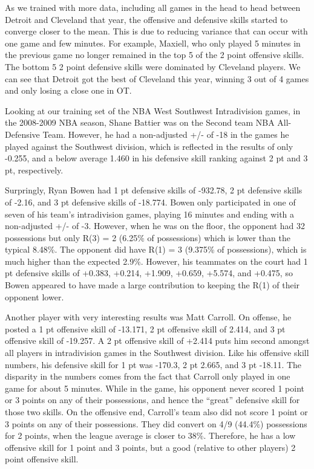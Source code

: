 \documentclass[10pt,twocolumn]{article}
\begin{document}
As we trained with more data, including all games in the head to head between Detroit and Cleveland that year, the offensive and defensive skills started to converge closer to the mean. This is due to reducing variance that can occur with one game and few minutes. For example, Maxiell, who only played 5 minutes in the previous game no longer remained in the top 5 of the 2 point offensive skills. The bottom 5 2 point defensive skills were dominated by Cleveland players. We can see that Detroit got the best of Cleveland this year, winning 3 out of 4 games and only losing a close one in OT.


Looking at our training set of the NBA West Southwest Intradivision games, in the 2008-2009 NBA season, Shane Battier was on the Second team NBA All-Defensive Team. However, he had a non-adjusted +/- of -18 in the games he played against the Southwest division, which is reflected in the results of only -0.255, and a below average 1.460 in his defensive skill ranking against 2 pt and 3 pt, respectively. 

Surpringly, Ryan Bowen had 1 pt defensive skills of -932.78, 2 pt defensive skills of -2.16, and 3 pt defensive skills of -18.774. Bowen only participated in one of seven of his team's intradivision games, playing 16 minutes and ending with a non-adjusted +/- of -3. However, when he was on the floor, the opponent had 32 possessions but only R(3) = 2 (6.25\% of possessions) which is lower than the typical 8.48\%. The opponent did have R(1) = 3 (9.375\% of possessions), which is much higher than the expected 2.9\%. However, his teammates on the court had 1 pt defensive skills of +0.383, +0.214, +1.909, +0.659, +5.574, and +0.475, so Bowen appeared to have made a large contribution to keeping the R(1) of their opponent lower. 

Another player with very interesting results was Matt Carroll. On offense, he posted a 1 pt offensive skill of -13.171, 2 pt offensive skill of 2.414, and 3 pt offensive skill of -19.257. A 2 pt offensive skill of +2.414 puts him second amongst all players in intradivision games in the Southwest division. Like his offensive skill numbers, his defensive skill for 1 pt was -170.3, 2 pt 2.665, and 3 pt -18.11. The disparity in the numbers comes from the fact that Carroll only played in one game for about 5 minutes. While in the game, his opponent never scored 1 point or 3 points on any of their possessions, and hence the ``great'' defensive skill for those two skills. On the offensive end, Carroll's team also did not score 1 point or 3 points on any of their possessions. They did convert on 4/9 (44.4\%) possessions for 2 points, when the league average is closer to 38\%. Therefore, he has a low offensive skill for 1 point and 3 points, but a good (relative to other players) 2 point offensive skill.
\end{document}
